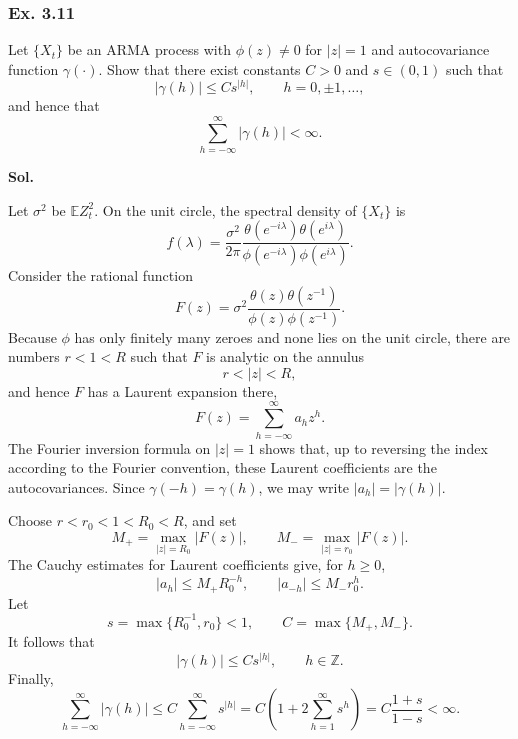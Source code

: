 \documentclass[lang=en,11pt,a4paper,citestyle =authoryear]{elegantpaper}
\begin{document}
\subsubsection*{Ex. 3.11}
Let $\{X_t\}$ be an ARMA process with $\phi(z)\neq 0$ for $|z|=1$
and autocovariance function $\gamma(\cdot)$. Show that there exist constants
$C>0$ and $s\in(0,1)$ such that
\[
|\gamma(h)|\leq Cs^{|h|},\qquad h=0,\pm1,\ldots,
\]
and hence that
\[
\sum_{h=-\infty}^{\infty}|\gamma(h)|<\infty.
\]
\par\vspace{0.5em}
\textbf{Sol.}\par
Let $\sigma^2$ be $\mathbb{E} Z_t^2$. On the unit circle, the spectral
density of $\{X_t\}$ is
\[
f(\lambda)=\frac{\sigma^2}{2\pi}
\frac{\theta(e^{-i\lambda})\theta(e^{i\lambda})}
     {\phi(e^{-i\lambda})\phi(e^{i\lambda})}.
\]
Consider the rational function
\[
F(z)=\sigma^2
\frac{\theta(z)\theta(z^{-1})}
     {\phi(z)\phi(z^{-1})}.
\]
Because $\phi$ has only finitely many zeroes and none lies on the unit
circle, there are numbers $r<1<R$ such that $F$ is analytic on the annulus
\[
r<|z|<R,
\]
and hence $F$ has a Laurent expansion there,
\[
F(z)=\sum_{h=-\infty}^{\infty}a_hz^h.
\]
The Fourier inversion formula on $|z|=1$ shows that, up to reversing the
index according to the Fourier convention, these Laurent coefficients are
the autocovariances. Since $\gamma(-h)=\gamma(h)$, we may write
$|a_h|=|\gamma(h)|$.

Choose $r<r_0<1<R_0<R$, and set
\[
M_+=\max_{|z|=R_0}|F(z)|,
\qquad
M_- =\max_{|z|=r_0}|F(z)|.
\]
The Cauchy estimates for Laurent coefficients give, for $h\geq 0$,
\[
|a_h|\leq M_+R_0^{-h},
\qquad
|a_{-h}|\leq M_-r_0^h.
\]
Let
\[
s=\max\{R_0^{-1},r_0\}<1,
\qquad
C=\max\{M_+,M_-\}.
\]
It follows that
\[
|\gamma(h)|\leq Cs^{|h|},
\qquad h\in\mathbb Z.
\]
Finally,
\[
\sum_{h=-\infty}^{\infty}|\gamma(h)|
\leq C\sum_{h=-\infty}^{\infty}s^{|h|}
=C\left(1+2\sum_{h=1}^{\infty}s^h\right)
=C\frac{1+s}{1-s}<\infty.
\]
\vspace{1em}
\end{document}
